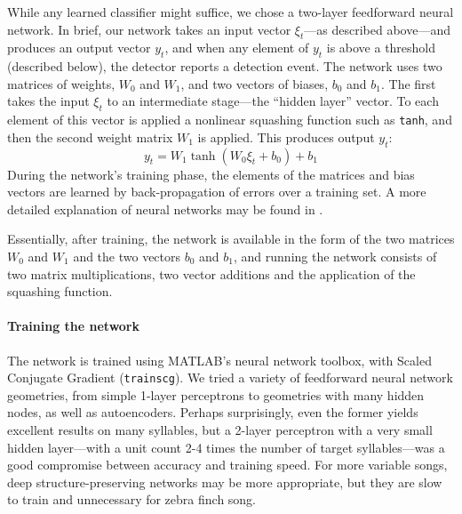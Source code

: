 \documentclass[10pt,letterpaper]{article}
\renewcommand{\subsubsection}[1]{\paragraph{#1}}
\begin{document}
While any learned classifier might suffice, we chose a two-layer
feedforward neural network.  In brief, our network takes an input
vector $\xi_t$---as described above---and produces an output vector
$y_t$, and when any element of $y_t$ is above a threshold (described
below), the detector reports a detection event.  The network uses two
matrices of weights, $W_0$ and $W_1$, and two vectors of biases, $b_0$
and $b_1$.  The first takes the input $\xi_t$ to an intermediate
stage---the ``hidden layer'' vector.  To each element of this vector
is applied a nonlinear squashing function such as {\tt tanh}, and then
the second weight matrix $W_1$ is applied.  This produces output
$y_t$:
\begin{equation*}
  y_t = W_1 \tanh (W_0 \xi_t + b_0) + b_1
\end{equation*}
During the network's training phase, the elements of the matrices and
bias vectors are learned by back-propagation of errors over a training
set.  A more detailed explanation of neural networks may be found in
\cite{hkp}.

Essentially, after training, the network is available in the form of
the two matrices $W_0$ and $W_1$ and the two vectors $b_0$ and $b_1$,
and running the network consists of two matrix multiplications, two
vector additions and the application of the squashing function.

\subsubsection{Training the network}

The network is trained using MATLAB's neural network toolbox, with
Scaled Conjugate Gradient ({\tt trainscg}). We tried a variety of
feedforward neural network geometries, from simple 1-layer perceptrons
to geometries with many hidden nodes, as well as autoencoders. Perhaps
surprisingly, even the former yields excellent results on many
syllables, but a 2-layer perceptron with a very small hidden
layer---with a unit count 2-4 times the number of target
syllables---was a good compromise between accuracy and training
speed. For more variable songs, deep structure-preserving networks may
be more appropriate, but they are slow to train and unnecessary for
zebra finch song.
\end{document}
